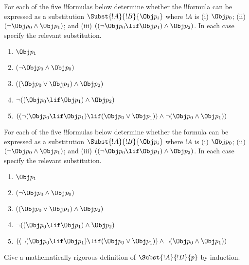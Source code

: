\documentclass[../../../include/open-logic-section]{subfiles}
\begin{document}
\begin{prob} For each of the five !!{formula}s below determine whether the 
 !!{formula} can be expressed as a substitution \( \Subst{!A}{!B}{\Obj p_i} \)
 where \( !A \) is (i) \( \Obj p_0 \); (ii) \( ( \lnot \Obj p_0 \land \Obj
 p_1) \); and (iii) \( ( ( \lnot \Obj p_0 \lif \Obj p_1 ) \land \Obj
 p_2 ) \). In each case specify the relevant substitution.
  \begin{enumerate}
    \item \( \Obj p_1 \) 
    \item \( ( \lnot \Obj p_0 \land \Obj p_0 ) \)
    \item \( ( ( \Obj p_0 \lor \Obj p_1 ) \land \Obj p_2 )  \)
    \item \( \lnot ( ( \Obj p_0 \lif \Obj p_1 ) \land \Obj p_2 ) \)
    \item \( (( \lnot ( \Obj p_0 \lif \Obj p_1 ) \lif ( \Obj p_0 \lor \Obj p_1 )) \land \lnot ( \Obj p_0 \land \Obj p_1 )) \)
  \end{enumerate}
\end{prob}

\begin{prob}
  For each of the five !!{formula}s below determine whether the formula can be expressed as a substitution \( \Subst{!A}{!B}{\Obj p_i} \) where \( !A \) is (i) \( \Obj p_0 \); (ii) \( ( \lnot \Obj p_0 \land \Obj p_1) \); and (iii) \( ( ( \lnot \Obj p_0 \lif \Obj p_1 ) \land \Obj p_2 ) \). In each case specify the relevant substitution.
  \begin{enumerate}
    \item \( \Obj p_1 \) 
    \item \( ( \lnot \Obj p_0 \land \Obj p_0 ) \)
    \item \( ( ( \Obj p_0 \lor \Obj p_1 ) \land \Obj p_2 )  \)
    \item \( \lnot ( ( \Obj p_0 \lif \Obj p_1 ) \land \Obj p_2 ) \)
    \item \( (( \lnot ( \Obj p_0 \lif \Obj p_1 ) \lif ( \Obj p_0 \lor \Obj p_1 )) \land \lnot ( \Obj p_0 \land \Obj p_1 )) \)
  \end{enumerate}
\end{prob}

\begin{prob}
Give a mathematically rigorous definition of $\Subst{!A}{!B}{p}$ by
induction.
\end{prob}
\end{document}
